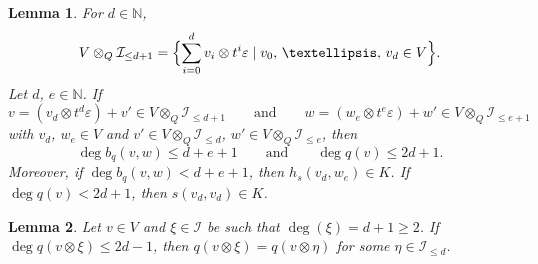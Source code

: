 \documentclass[10pt,a4paper]{amsart}
\newtheorem{lemma}{Lemma}
\newcommand{\calI}{\mathcal{I}}
\begin{document}
\begin{lemma}
  \label{lem:deg}
  For $d\in\mathbb{N}$,
  \[
    V\otimes_Q\calI_{\leq d+1} = \Bigl\{
    \sum_{i=0}^d v_i\otimes t^i\varepsilon\mid v_0,\,\ldots,\,v_d\in
    V\Bigr\}.
  \]
  Let $d$, $e\in\mathbb{N}$. If
  \[
    v=(v_{d}\otimes t^{d}\varepsilon) + v'\in V\otimes_Q\calI_{\leq d+1}
    \qquad\text{and}\qquad
    w = (w_{e}\otimes t^{e}\varepsilon) + w'\in V\otimes_Q\calI_{\leq e+1}
  \]
  with $v_{d}$, $w_{e}\in V$ and $v'\in V\otimes_Q\calI_{\leq
    d}$, $w'\in V\otimes_Q\calI_{\leq e}$, then
  \[
    \deg b_q(v,w) \leq d+e+1 \qquad\text{and}\qquad
    \deg q(v) \leq 2d+1.
  \]
  Moreover, if $\deg b_q(v,w)< d+e+1$, then $h_s(v_{d},
  w_{e})\in K$. If $\deg q(v) <2d+1$, then
  $s(v_{d},v_{d})\in K$.
\end{lemma}

\begin{lemma}
  \label{lem:key}
  Let $v\in V$ and $\xi\in\calI$ be such that $\deg(\xi)=d+1\geq2$. If
  $\deg q(v\otimes\xi)\leq2d-1$, then
  $q(v\otimes\xi) = q(v\otimes\eta)$ for some
  $\eta\in\calI_{\leq d}$.
\end{lemma}
\end{document}
